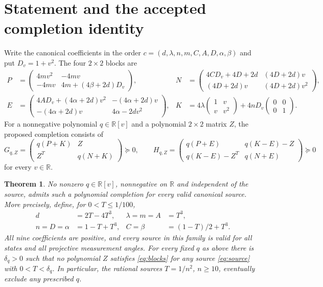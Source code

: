 \documentclass[11pt]{article}
\newtheorem{theorem}{Theorem}
\newcommand{\R}{\mathbb R}
\begin{document}
\section{Statement and the accepted completion identity}
Write the canonical coefficients in the order
$c=(d,\lambda,n,m,C,A,D,\alpha,\beta)$ and put $D_v=1+v^2$.
The four $2\times2$ blocks are
\begin{align*}
P&=\begin{pmatrix}4mv^2&-4mv\\-4mv&4m+(4\beta+2d)D_v\end{pmatrix},&
N&=\begin{pmatrix}4CD_v+4D+2d&(4D+2d)v\\(4D+2d)v&(4D+2d)v^2\end{pmatrix},\\
E&=\begin{pmatrix}4AD_v+(4\alpha+2d)v^2&-(4\alpha+2d)v\\-(4\alpha+2d)v&4\alpha-2dv^2\end{pmatrix},&
K&=4\lambda\begin{pmatrix}1&v\\v&v^2\end{pmatrix}
+4nD_v\begin{pmatrix}0&0\\0&1\end{pmatrix}.
\end{align*}
For a nonnegative polynomial $q\in\R[v]$ and a polynomial $2\times2$ matrix $Z$,
the proposed completion consists of
\begin{equation}\label{eq:blocks}
G_{q,Z}=\begin{pmatrix}q(P+K)&Z\\Z^T&q(N+K)\end{pmatrix}\succeq0,
\qquad
H_{q,Z}=\begin{pmatrix}q(P+E)&q(K-E)-Z\\q(K-E)-Z^T&q(N+E)\end{pmatrix}\succeq0
\end{equation}
for every $v\in\R$.
\begin{theorem}\label{thm:main}
No nonzero $q\in\R[v]$, nonnegative on $\R$ and independent of the source,
admits such a polynomial completion for every valid canonical source.
More precisely, define, for $0<T\leq1/100$,
\begin{equation}\label{eq:source}
\boxed{\begin{aligned}
d&=2T-4T^3,&\lambda=m=A&=T^3,\\
n=D=\alpha&=1-T+T^3,&C=\beta&=(1-T)/2+T^3.
\end{aligned}}
\end{equation}
All nine coefficients are positive, and every source in this family is valid
for all states and all projective measurement angles.
For every fixed $q$ as above there is $\delta_q>0$ such that no polynomial $Z$
satisfies \eqref{eq:blocks} for any source \eqref{eq:source} with
$0<T<\delta_q$.
In particular, the rational sources $T=1/n^2$, $n\geq10$, eventually exclude
any prescribed $q$.
\end{theorem}
\end{document}
